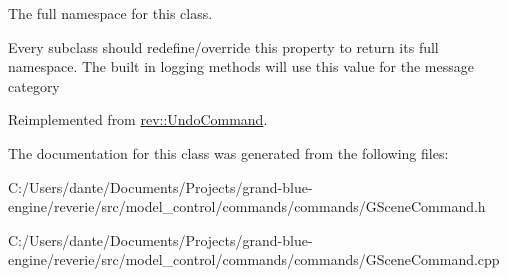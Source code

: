 The full namespace for this class. 

Every subclass should redefine/override this property to return its full namespace. The built in logging methods will use this value for the message category 

Reimplemented from \mbox{\hyperlink{classrev_1_1_undo_command_aea7ceb3f5ea266e697f01a65da7afec5}{rev\+::\+Undo\+Command}}.



The documentation for this class was generated from the following files\+:\begin{DoxyCompactItemize}
\item 
C\+:/\+Users/dante/\+Documents/\+Projects/grand-\/blue-\/engine/reverie/src/model\+\_\+control/commands/commands/G\+Scene\+Command.\+h\item 
C\+:/\+Users/dante/\+Documents/\+Projects/grand-\/blue-\/engine/reverie/src/model\+\_\+control/commands/commands/G\+Scene\+Command.\+cpp\end{DoxyCompactItemize}
